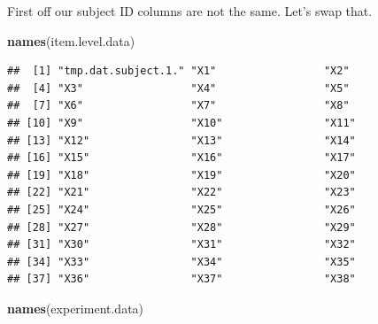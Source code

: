 \documentclass[]{book}
\newenvironment{Shaded}{\begin{snugshade}}{\end{snugshade}}
\newcommand{\KeywordTok}[1]{\textcolor[rgb]{0.13,0.29,0.53}{\textbf{#1}}}
\newcommand{\NormalTok}[1]{#1}
\theoremstyle{definition}
\theoremstyle{definition}
\theoremstyle{definition}
\theoremstyle{remark}
\begin{document}
First off our subject ID columns are not the same. Let's swap that.

\begin{Shaded}
\begin{Highlighting}[]
\KeywordTok{names}\NormalTok{(item.level.data)}
\end{Highlighting}
\end{Shaded}

\begin{verbatim}
##  [1] "tmp.dat.subject.1." "X1"                 "X2"                
##  [4] "X3"                 "X4"                 "X5"                
##  [7] "X6"                 "X7"                 "X8"                
## [10] "X9"                 "X10"                "X11"               
## [13] "X12"                "X13"                "X14"               
## [16] "X15"                "X16"                "X17"               
## [19] "X18"                "X19"                "X20"               
## [22] "X21"                "X22"                "X23"               
## [25] "X24"                "X25"                "X26"               
## [28] "X27"                "X28"                "X29"               
## [31] "X30"                "X31"                "X32"               
## [34] "X33"                "X34"                "X35"               
## [37] "X36"                "X37"                "X38"
\end{verbatim}

\begin{Shaded}
\begin{Highlighting}[]
\KeywordTok{names}\NormalTok{(experiment.data)}
\end{Highlighting}
\end{Shaded}
\end{document}
